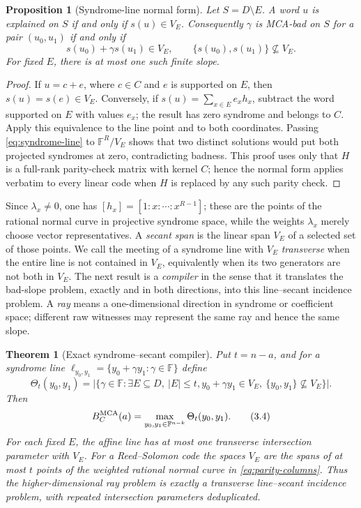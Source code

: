 \documentclass[11pt,a4paper]{amsart}
\numberwithin{equation}{section}
\newtheorem{theorem}{Theorem}[section]
\newtheorem{proposition}[proposition]{Proposition}
\theoremstyle{remark}
\newcommand{\F}{\mathbb F}
\newcommand{\abs}[1]{\lvert #1\rvert}
\begin{document}
\begin{proposition}[Syndrome-line normal form]
\label{prop:syndrome-line-normal-form}
Let \(S=D\setminus E\).  A word \(u\) is explained on \(S\) if and only if
\(s(u)\in V_E\).  Consequently \(\gamma\) is MCA-bad on \(S\) for a pair
\((u_0,u_1)\) if and only if
\[
 s(u_0)+\gamma s(u_1)\in V_E,
 \qquad
 \{s(u_0),s(u_1)\}\not\subseteq V_E.
 \tag{3.2}\label{eq:syndrome-line}
\]
For fixed \(E\), there is at most one such finite slope.
\end{proposition}

\begin{proof}
If \(u=c+e\), where \(c\in C\) and \(e\) is supported on \(E\), then
\(s(u)=s(e)\in V_E\).  Conversely, if
\(s(u)=\sum_{x\in E}e_xh_x\), subtract the word supported on \(E\) with
values \(e_x\); the result has zero syndrome and belongs to \(C\).  Apply
this equivalence to the line point and to both coordinates.  Passing
\eqref{eq:syndrome-line} to \(\F^R/V_E\) shows that two distinct solutions
would put both projected syndromes at zero, contradicting badness.
This proof uses only that \(H\) is a full-rank parity-check matrix with
kernel \(C\); hence the normal form applies verbatim to every linear code
when \(H\) is replaced by any such parity check.
\end{proof}

Since \(\lambda_x\ne0\), one has
\([h_x]=[1:x:\cdots:x^{R-1}]\); these are the points of the rational
normal curve in projective syndrome space, while the weights
\(\lambda_x\) merely choose vector representatives.  A \emph{secant span} is the linear span
\(V_E\) of a selected set of those points.  We call the meeting of a
syndrome line with \(V_E\) \emph{transverse} when the entire line is not
contained in \(V_E\), equivalently when its two generators are not both in
\(V_E\).  The next result is a \emph{compiler} in the sense that it
translates the bad-slope problem, exactly and in both directions, into this
line--secant incidence problem.  A \emph{ray} means a one-dimensional
direction in syndrome or coefficient space; different raw witnesses may
represent the same ray and hence the same slope.

\begin{theorem}[Exact syndrome--secant compiler]
\label{thm:syndrome-secant-exact}
Put \(t=n-a\), and for a syndrome line
\(\ell_{y_0,y_1}=\{y_0+\gamma y_1:\gamma\in\F\}\) define
\[
 \Theta_t(y_0,y_1)=
 \abs{\{\gamma\in\F:\exists E\subseteq D,\ \abs E\le t,
 y_0+\gamma y_1\in V_E,
 \ \{y_0,y_1\}\not\subseteq V_E\}}.
 \tag{3.3}\label{eq:transverse-secant-count}
\]
Then
\[
 B_C^{\rm MCA}(a)=\max_{y_0,y_1\in\F^{n-k}}
                    \Theta_t(y_0,y_1).
 \tag{3.4}\label{eq:exact-secant-numerator}
\]
For each fixed \(E\), the affine line has at most one transverse
intersection parameter with \(V_E\).  For a Reed--Solomon code the
spaces \(V_E\) are the spans of at most \(t\) points of the weighted
rational normal curve in \eqref{eq:parity-columns}.  Thus the
higher-dimensional ray problem is exactly a transverse line--secant
incidence problem, with repeated intersection parameters deduplicated.
\end{theorem}
\end{document}
